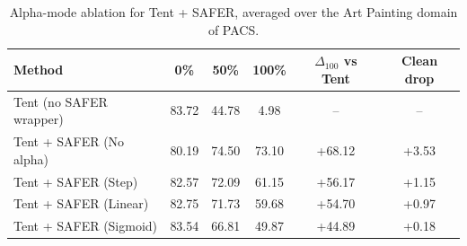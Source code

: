 \begin{table}[t]
\centering
\caption{Alpha-mode ablation for Tent + SAFER, averaged over the Art Painting domain of PACS.}
\label{tab:abl-alpha-mode}
\begin{tabular}{lccccc}
\hline
Method & 0\% & 50\% & 100\% & $\Delta_{100}$ vs Tent & Clean drop \\
\hline
Tent (no SAFER wrapper) & 83.72 & 44.78 & 4.98 & -- & -- \\
Tent + SAFER (No alpha) & 80.19 & 74.50 & 73.10 & +68.12 & +3.53 \\
Tent + SAFER (Step) & 82.57 & 72.09 & 61.15 & +56.17 & +1.15 \\
Tent + SAFER (Linear) & 82.75 & 71.73 & 59.68 & +54.70 & +0.97 \\
Tent + SAFER (Sigmoid) & 83.54 & 66.81 & 49.87 & +44.89 & +0.18 \\
\hline
\end{tabular}
\end{table}
